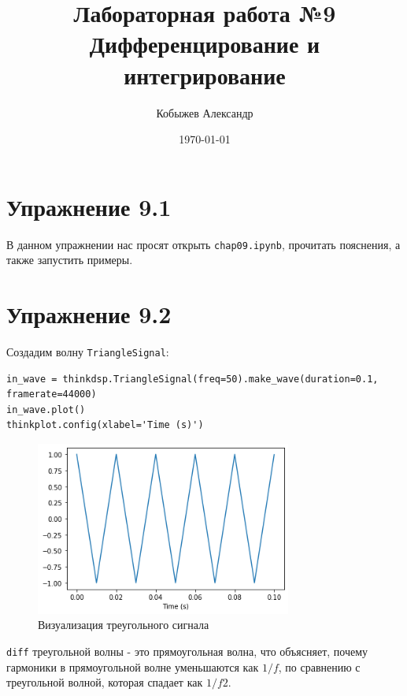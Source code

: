 \documentclass[a4paper,12pt]{report}
\title{Лабораторная работа №9\\Дифференцирование и интегрирование}
\author{Кобыжев Александр}
\date{\today}
\begin{document}
\maketitle
\tableofcontents
\listoffigures
\lstlistoflistings

\maketitle

\chapter{Упражнение 9.1}

В данном упражнении нас просят открыть \texttt{chap09.ipynb}, прочитать пояснения, а также запустить примеры. 

\chapter{Упражнение 9.2}

Создадим волну \texttt{TriangleSignal}:

\begin{lstlisting}[caption=Создание треугольного сигнала]
in_wave = thinkdsp.TriangleSignal(freq=50).make_wave(duration=0.1, framerate=44000)
in_wave.plot()
thinkplot.config(xlabel='Time (s)')
\end{lstlisting}

\begin{figure}[H]
        \centering
        \includegraphics[width=0.75\textwidth]{lab9_fig2_1.png}
        \caption{Визуализация треугольного сигнала}
        \label{fig:lab9_fig2_1}
\end{figure}

\texttt{diff} треугольной волны - это прямоугольная волна, что объясняет, почему гармоники в прямоугольной волне уменьшаются как $1/f$, по сравнению с треугольной волной, которая спадает как $1/f2$.
\end{document}
